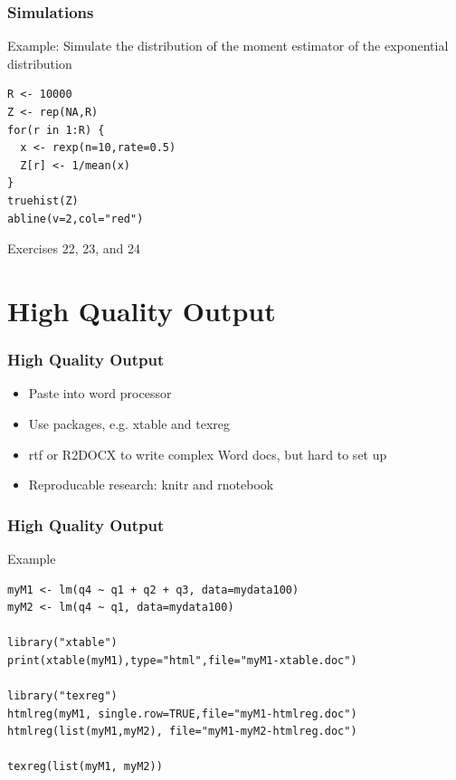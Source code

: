 \documentclass[xcolor={svgnames},10pt,
handout
]{beamer}
\begin{document}
\begin{frame}[fragile]
\frametitle{Simulations}
Example: Simulate the distribution of the moment estimator of the exponential distribution
\begin{lstlisting}
R <- 10000
Z <- rep(NA,R)
for(r in 1:R) {
  x <- rexp(n=10,rate=0.5)
  Z[r] <- 1/mean(x)
}
truehist(Z)
abline(v=2,col="red")
\end{lstlisting}
\end{frame}

\begin{frame}[standout]
Exercises 22, 23, and 24
\end{frame}





\section{High Quality Output}

\begin{frame}[fragile]
\frametitle{High Quality Output}
\begin{itemize}
\item Paste into word processor
\item Use packages, e.g. xtable and texreg
\item rtf or R2DOCX to write complex Word docs, but hard to set up
\item Reproducable research: knitr and rnotebook
\end{itemize}
\end{frame}

\begin{frame}[fragile]\frametitle{High Quality Output}
Example
\begin{lstlisting}
myM1 <- lm(q4 ~ q1 + q2 + q3, data=mydata100)
myM2 <- lm(q4 ~ q1, data=mydata100)

library("xtable")
print(xtable(myM1),type="html",file="myM1-xtable.doc")

library("texreg")
htmlreg(myM1, single.row=TRUE,file="myM1-htmlreg.doc")
htmlreg(list(myM1,myM2), file="myM1-myM2-htmlreg.doc")

texreg(list(myM1, myM2))
\end{lstlisting}
\end{frame}
\end{document}
